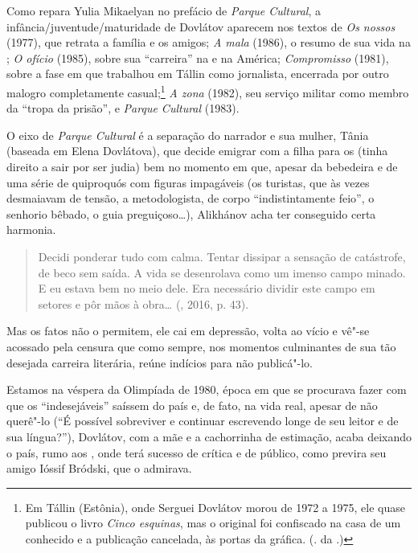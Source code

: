 Como repara Yulia Mikaelyan no prefácio de \emph{Parque Cultural}, a infância/juventude/maturidade
de Dovlátov aparecem nos textos de \emph{Os
nossos} (1977), que retrata a família e os amigos; \emph{A mala} (1986), o resumo
de sua vida na ; \emph{O ofício} (1985), sobre sua
``carreira'' na  e na América; \emph{Compromisso} (1981),
sobre a fase em que trabalhou em Tállin como jornalista, encerrada por
outro malogro completamente casual;\footnote{Em Tállin (Estônia), onde Serguei Dovlátov morou
 de 1972 a 1975, ele quase publicou o livro \emph{Cinco esquinas},
 mas o original foi confiscado na casa de um conhecido e a publicação
 cancelada, às portas da gráfica. (. da .)} \emph{A zona} (1982), seu serviço
militar como membro da ``tropa da prisão'', e \emph{Parque Cultural} (1983).

O eixo de \emph{Parque Cultural} é a separação do narrador e sua mulher,
Tânia (baseada em Elena Dovlátova), que decide emigrar com a filha para os  (tinha direito a sair por ser judia)
bem no momento em que, apesar da bebedeira e de uma
série de quiproquós com figuras impagáveis (os turistas, que às vezes
desmaiavam de tensão, a metodologista, de corpo ``indistintamente feio'', o
senhorio bêbado, o guia preguiçoso\ldots{}), Alikhánov acha ter conseguido
certa harmonia.

\begin{quotation}
Decidi ponderar tudo com calma. Tentar dissipar a
sensação de catástrofe, de beco sem saída. A vida se desenrolava como um
imenso campo minado. E eu estava bem no meio dele. Era necessário
dividir este campo em setores e pôr mãos à obra\ldots{} (, 2016, p. 43).
\end{quotation} 

Mas os fatos não o permitem, ele cai em depressão, volta ao vício e vê"-se acossado pela
censura que como sempre, nos momentos culminantes de sua tão desejada
carreira literária, reúne indícios para não publicá"-lo. 

Estamos na véspera da Olimpíada de 1980, época em que se procurava fazer com que
os ``indesejáveis'' saíssem do país e, de fato, na vida real,
apesar de não querê"-lo (``É possível sobreviver e continuar escrevendo
longe de seu leitor e de sua língua?''), Dovlátov, com a mãe e a
cachorrinha de estimação, acaba deixando o país, rumo aos , onde terá sucesso de crítica
e de público, como previra seu amigo Ióssif Bródski, que o admirava.

